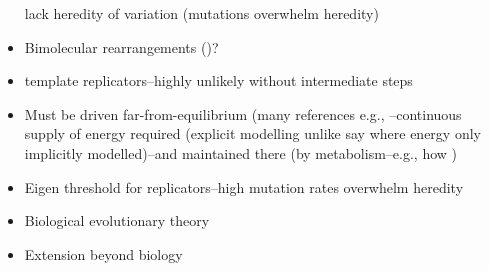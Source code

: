 \begin{itemize}
	      lack heredity of variation (mutations overwhelm heredity) \autocite{Vasas2010}
	\item
	      Bimolecular rearrangements (\autocite{Fernando:2008xy,Fernando:2007pf})?
	\item
	      template replicators--highly unlikely without intermediate steps
	\item
	      Must be driven far-from-equilibrium (many references e.g.,
	      \autocite{Pascal2015}--continuous supply of energy required (explicit
	      modelling unlike say \autocite{Fontana1994} where energy only
	      implicitly modelled)--and maintained there (by metabolism--e.g., how
	      )
	\item
	      Eigen threshold for replicators--high mutation rates overwhelm
	      heredity
	\item
	      Biological evolutionary theory
	\item
	      Extension beyond biology
	      	

\end{itemize}

